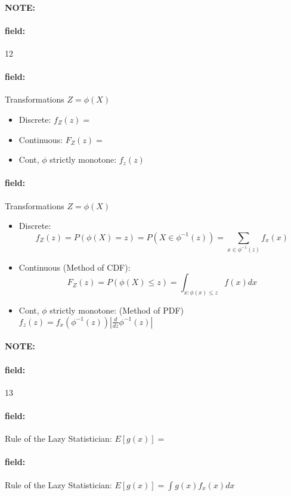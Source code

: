 \documentclass[12pt]{article}
\newenvironment{note}{\paragraph{NOTE:}}{}
\newenvironment{field}{\paragraph{field:}}{}
\begin{document}
\begin{note}
  \begin{field}
    \tiny 12
  \end{field}
  \begin{field}
     Transformations $Z = \phi(X)$

    \begin{itemize}
      \item Discrete: $f_Z(z) = $
      \item Continuous: $F_Z(z)=$
      \item Cont, $\phi$ strictly monotone:
      $f_z(z)$
    \end{itemize}
  \end{field}
  \begin{field}
    Transformations $Z = \phi(X)$
  \begin{itemize}
    \item Discrete: $$f_Z(z) = P(\phi(X) = z) = P(X \in \phi^{-1}(z)) = \sum_{x \in \phi^{-1}(z)}f_x(x) $$
    \item Continuous (Method of CDF): $$F_Z(z)= P(\phi(X)\leq z) = \int_{x:\phi(x)\leq z} f(x) dx$$
    \item Cont, $\phi$ strictly monotone: (Method of PDF)
    $f_z(z) = f_x(\phi^{-1}(z))|\frac{d}{dz} \phi^{-1}(z)|$
  \end{itemize}
\end{field}
\end{note}

\begin{note}
  \begin{field}
    \tiny 13
  \end{field}
  \begin{field}
     Rule of the Lazy Statistician: $ E[g(x)] = $
  \end{field}
  \begin{field}
    Rule of the Lazy Statistician:  $E[g(x)] = \int g(x)f_x(x)dx$
  \end{field}
\end{note}
\end{document}
